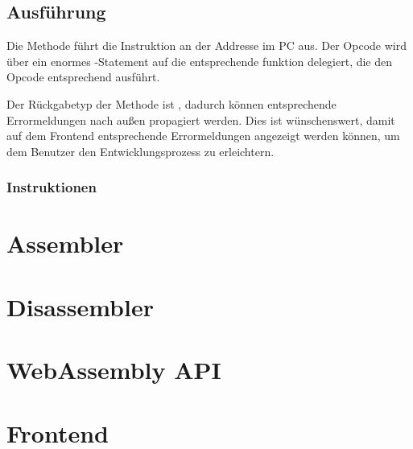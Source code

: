 \subsection{Ausführung}

Die  Methode führt die Instruktion an der Addresse im PC aus. Der Opcode wird über ein enormes -Statement auf die entsprechende funktion delegiert, die den Opcode entsprechend ausführt.

Der Rückgabetyp der Methode ist , dadurch können entsprechende Errormeldungen nach außen propagiert werden. Dies ist wünschenswert, damit auf dem Frontend entsprechende Errormeldungen angezeigt werden können, um dem Benutzer den Entwicklungsprozess zu erleichtern.

\subsubsection{Instruktionen}

\section{Assembler}

\section{Disassembler}

\section{WebAssembly API}

\section{Frontend}
